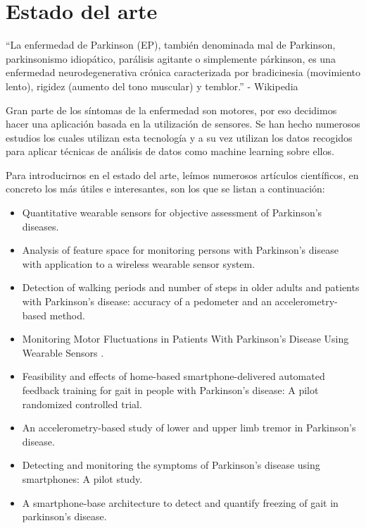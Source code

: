 \documentclass[11pt,spanish]{article}
\begin{document}

\newpage
\tableofcontents
\newpage
\listoffigures
\newpage

\section{Estado del arte}
“La enfermedad de Parkinson (EP), también denominada mal de Parkinson, parkinsonismo idiopático, parálisis agitante o simplemente párkinson, es una enfermedad neurodegenerativa crónica caracterizada por bradicinesia (movimiento lento), rigidez (aumento del tono muscular) y temblor.” - Wikipedia
\newline

Gran parte de los síntomas de la enfermedad son motores, por eso decidimos hacer una aplicación basada en la utilización de sensores. Se han hecho numerosos estudios los cuales utilizan esta tecnología y a su vez utilizan los datos recogidos para aplicar técnicas de análisis de datos como machine learning sobre ellos.
\newline

Para introducirnos en el estado del arte, leímos numerosos artículos científicos, en concreto los más útiles e interesantes, son los que se listan a continuación:
\newline

\begin{itemize}
	\item Quantitative wearable sensors for objective assessment of Parkinson’s diseases.
	\item Analysis of feature space for monitoring persons with Parkinson’s disease with application to a wireless wearable sensor system. 
	\item Detection of walking periods and number of steps in older adults and patients with Parkinson’s disease: accuracy of a pedometer and an accelerometry-based method. 
	\item Monitoring Motor Fluctuations in Patients With Parkinson’s Disease Using Wearable Sensors . 
	\item Feasibility and effects of home-based smartphone-delivered automated feedback training for gait in people with Parkinson’s disease: A pilot randomized controlled trial.
	\item An accelerometry-based study of lower and upper limb tremor in Parkinson’s disease. 
	\item Detecting and monitoring the symptoms of Parkinson’s disease using smartphones: A pilot study.
	\item A smartphone-base architecture to detect and quantify freezing of gait in parkinson’s disease.
    \newline
\end{itemize}
\end{document}
